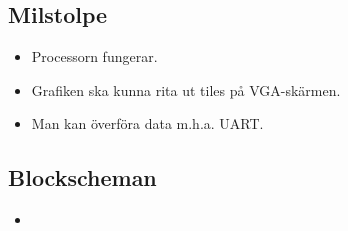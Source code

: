\documentclass[a4paper,titlepage]{article}
\begin{document}
	\subsection{Milstolpe}
        \begin{itemize}
			\item Processorn fungerar.
			\item Grafiken ska kunna rita ut tiles på VGA-skärmen.
			\item Man kan överföra data m.h.a. UART.
        \end{itemize}
	\subsection{Blockscheman}
        \begin{itemize}
			\item 
        \end{itemize}
\end{document}
